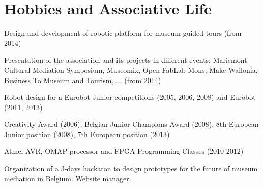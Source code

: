 \documentclass[a4paper]{deedy-resume} %
\begin{document}
\sectionspace %
\vspace{5pt}


\section{Hobbies and Associative Life}
\vspace{5pt}


\vspace{5pt} %
\begin{tightitemize}
	\item Design and development of robotic platform for museum guided tours (from 2014)
	\item Presentation of the association and its projects in different events: Mariemont Cultural Mediation Symposium, Museomix, Open FabLab Mons, Make Wallonia, Business To Museum and Tourism, ... (from 2014)
	\item Robot design for a Eurobot Junior competitions (2005, 2006, 2008) and Eurobot (2011, 2013)
	\item Creativity Award (2006), Belgian Junior Champions Award (2008), 8th European Junior position (2008), 7th European position (2013)
	\item Atmel AVR, OMAP processor and FPGA Programming Classes (2010-2012)
\end{tightitemize}

\vspace{12pt}


Organization of a 3-days hackaton to design prototypes for the future of museum mediation in Belgium. Website manager.


\vspace{12pt}

\end{document}
